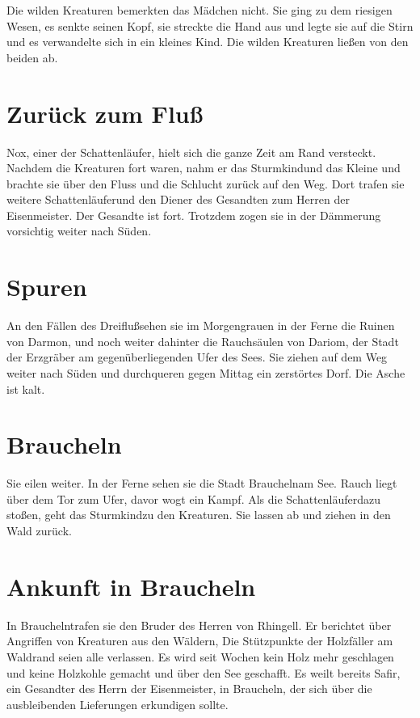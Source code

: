 \documentclass[12pt,a4paper,onecolumn,twoside,ngerman]{book}
\newcommand{\Sturmkind}{Sturmkind}
\newcommand{\Schattenlaufer}{Schattenläufer}
\newcommand{\Nox}{Nox}
\newcommand{\Rhingell}{Rhingell}
\newcommand{\Dreifluss}{Dreifluß}
\newcommand{\Braucheln}{Braucheln}
\newcommand{\Darmon}{Darmon}
\newcommand{\Eisenmeister}{Eisenmeister}
\newcommand{\Dariom}{Dariom}
\newcommand{\Safir}{Safir}
\begin{document}
Die wilden Kreaturen bemerkten das Mädchen nicht. Sie ging zu dem riesigen Wesen, es senkte seinen Kopf, sie streckte die Hand aus und legte sie auf die Stirn und es verwandelte sich in ein kleines Kind. Die wilden Kreaturen ließen von den beiden ab.

\section{Zurück zum Fluß}
\Nox, einer der \Schattenlaufer, hielt sich die ganze Zeit am Rand versteckt. Nachdem die Kreaturen fort waren, nahm er das \Sturmkind und das Kleine und brachte sie über den Fluss und die Schlucht zurück auf den Weg. Dort trafen sie weitere \Schattenlaufer und den Diener des Gesandten zum Herren der \Eisenmeister. Der Gesandte ist fort. Trotzdem zogen sie in der Dämmerung vorsichtig weiter nach Süden.

\section{Spuren}
An den Fällen des \Dreifluss sehen sie im Morgengrauen in der Ferne die Ruinen von \Darmon, und noch weiter dahinter die Rauchsäulen von \Dariom, der Stadt der Erzgräber am gegenüberliegenden Ufer des Sees. Sie ziehen auf dem Weg weiter nach Süden und durchqueren gegen Mittag ein zerstörtes Dorf. Die Asche ist kalt.

\section{\Braucheln}
Sie eilen weiter. In der Ferne sehen sie die Stadt \Braucheln am See. Rauch liegt über dem Tor zum Ufer, davor wogt ein Kampf. Als die \Schattenlaufer dazu stoßen, geht das \Sturmkind zu den Kreaturen. Sie lassen ab und ziehen in den Wald zurück.

\section{Ankunft in \Braucheln}
In \Braucheln trafen sie den Bruder des Herren von \Rhingell. Er berichtet über Angriffen von Kreaturen aus den Wäldern, Die Stützpunkte der Holzfäller am Waldrand seien alle verlassen. Es wird seit Wochen kein Holz mehr geschlagen und keine Holzkohle gemacht und über den See geschafft. Es weilt bereits \Safir, ein Gesandter des Herrn der \Eisenmeister, in \Braucheln, der sich über die ausbleibenden Lieferungen erkundigen sollte.
\end{document}
